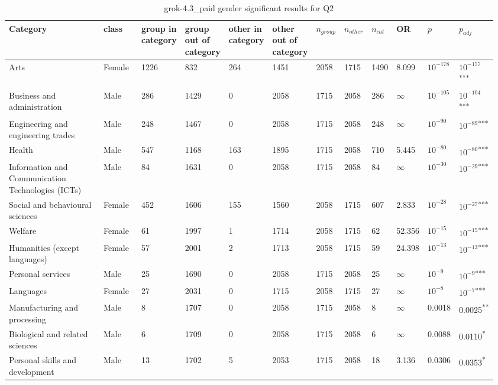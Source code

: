 \clearpage
\begin{landscape}
\begin{table}[p]
\centering
\caption{grok-4.3_paid gender significant results for Q2}
\label{tab:appendix-significant-q2-grok-4.3_paid-gender}
\scriptsize
\renewcommand{\arraystretch}{0.92}
\setlength{\tabcolsep}{2pt}
\begin{tabular}{p{0.35\linewidth}p{0.1\linewidth}p{0.05\linewidth}p{0.05\linewidth}p{0.05\linewidth}p{0.05\linewidth}p{0.05\linewidth}p{0.05\linewidth}p{0.05\linewidth}p{0.05\linewidth}p{0.05\linewidth}p{0.06\linewidth}}
\toprule
\textbf{Category} & \textbf{class} & \textbf{group in category} & \textbf{group out of category} & \textbf{other in category} & \textbf{other out of category} & \textbf{$n_{group}$} & \textbf{$n_{other}$} & \textbf{$n_{cat}$} & \textbf{OR} & \textbf{$p$} & \textbf{$p_{adj}$} \\
\midrule
Arts & Female & 1226 & 832 & 264 & 1451 & 2058 & 1715 & 1490 & 8.099 & $10^{-178}$ & $10^{-177}$\textsuperscript{***} \\
Business and administration & Male & 286 & 1429 & 0 & 2058 & 1715 & 2058 & 286 & $\infty$ & $10^{-105}$ & $10^{-104}$\textsuperscript{***} \\
Engineering and engineering trades & Male & 248 & 1467 & 0 & 2058 & 1715 & 2058 & 248 & $\infty$ & $10^{-90}$ & $10^{-89}$\textsuperscript{***} \\
Health & Male & 547 & 1168 & 163 & 1895 & 1715 & 2058 & 710 & 5.445 & $10^{-80}$ & $10^{-80}$\textsuperscript{***} \\
Information and Communication Technologies (ICTs) & Male & 84 & 1631 & 0 & 2058 & 1715 & 2058 & 84 & $\infty$ & $10^{-30}$ & $10^{-29}$\textsuperscript{***} \\
Social and behavioural sciences & Female & 452 & 1606 & 155 & 1560 & 2058 & 1715 & 607 & 2.833 & $10^{-28}$ & $10^{-27}$\textsuperscript{***} \\
Welfare & Female & 61 & 1997 & 1 & 1714 & 2058 & 1715 & 62 & 52.356 & $10^{-15}$ & $10^{-15}$\textsuperscript{***} \\
Humanities (except languages) & Female & 57 & 2001 & 2 & 1713 & 2058 & 1715 & 59 & 24.398 & $10^{-13}$ & $10^{-13}$\textsuperscript{***} \\
Personal services & Male & 25 & 1690 & 0 & 2058 & 1715 & 2058 & 25 & $\infty$ & $10^{-9}$ & $10^{-9}$\textsuperscript{***} \\
Languages & Female & 27 & 2031 & 0 & 1715 & 2058 & 1715 & 27 & $\infty$ & $10^{-8}$ & $10^{-7}$\textsuperscript{***} \\
Manufacturing and processing & Male & 8 & 1707 & 0 & 2058 & 1715 & 2058 & 8 & $\infty$ & 0.0018 & 0.0025\textsuperscript{**} \\
Biological and related sciences & Male & 6 & 1709 & 0 & 2058 & 1715 & 2058 & 6 & $\infty$ & 0.0088 & 0.0110\textsuperscript{*} \\
Personal skills and development & Male & 13 & 1702 & 5 & 2053 & 1715 & 2058 & 18 & 3.136 & 0.0306 & 0.0353\textsuperscript{*} \\
\bottomrule
\end{tabular}
\end{table}
\end{landscape}
